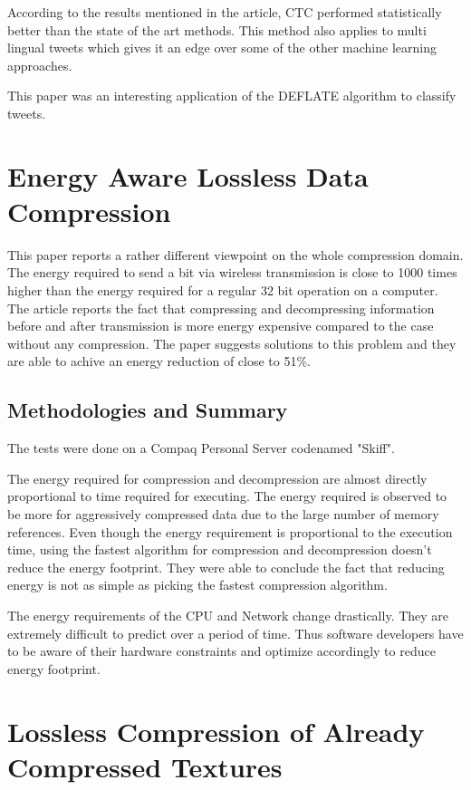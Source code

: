 \documentclass{article}
\begin{document}
According to the results mentioned in the article, CTC performed statistically better than the state of the art methods. This method also applies to multi lingual tweets which gives it an edge over some of the other machine learning approaches.

This paper was an interesting application of the DEFLATE algorithm to classify tweets.


\section{Energy Aware Lossless Data Compression \cite{10.1145/1151690.1151692}}

This paper reports a rather different viewpoint on the whole compression domain. The energy required to send a bit via wireless transmission is close to 1000 times higher than the energy required for a regular 32 bit operation on a computer. The article reports the fact that compressing and decompressing information before and after transmission is more energy expensive compared to the case without any compression. The paper suggests solutions to this problem and they are able to achive an energy reduction of close to 51\%.

\subsection{Methodologies and Summary}
The tests were done on a Compaq Personal Server codenamed "Skiff". 

The energy required for compression and decompression are almost directly proportional to time required for executing. The energy required is observed to be more for aggressively compressed data due to the large number of memory references. Even though the energy requirement is proportional to the execution time, using the fastest algorithm for compression and decompression doesn't reduce the energy footprint. They were able to conclude the fact that reducing energy is not as simple as picking the fastest compression algorithm.

The energy requirements of the CPU and Network change drastically. They are extremely difficult to predict over a period of time. Thus software developers have to be aware of their hardware constraints and optimize accordingly to reduce energy footprint. 

\section{Lossless Compression of Already Compressed Textures \cite{strom2011lossless}}
\end{document}
